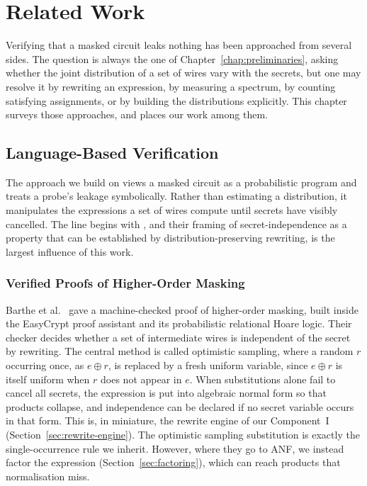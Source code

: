 \setlength{\parindent}{0pt}
\chapter{Related Work}
\label{chap:related}
Verifying that a masked circuit leaks nothing has been approached from several
sides.
The question is always the one of Chapter~\ref{chap:preliminaries}, asking whether the joint
distribution of a set of wires vary with the secrets, but one may resolve it by
rewriting an expression, by measuring a spectrum, by counting satisfying
assignments, or by building the distributions explicitly. This chapter surveys those
approaches, and places our work among them.

\section{Language-Based Verification} %
\label{sec:language-based}

The approach we build on views a masked circuit as a probabilistic program and
treats a probe's leakage symbolically. Rather than estimating a distribution, it
manipulates the expressions a set of wires compute until secrets have
visibly cancelled. The line begins with \parencite{barthe2015verified},
and their framing of secret-independence as a property that can be established by
distribution-preserving rewriting, is the largest influence of this work.

  \subsection{Verified Proofs of Higher-Order Masking}
  \label{sec:related-barthe}

  Barthe et al.\ \parencite{barthe2015verified} gave a machine-checked
  proof of higher-order masking, built inside the EasyCrypt proof assistant and
  its probabilistic relational Hoare logic. Their checker decides whether a set of %
  intermediate wires is independent of the secret by rewriting. The central
  method is called optimistic sampling, where a random $r$ occurring once, as
  $e \oplus r$, is replaced by a fresh uniform variable, since $e \oplus r$ is
  itself uniform when $r$ does not appear in $e$. When substitutions alone
  fail to cancel all secrets, the expression is put into algebraic normal form so that
  products collapse, and independence can be declared if no secret variable occurs in that form.
  This is, in miniature, the rewrite engine of our Component~I
  (Section~\ref{sec:rewrite-engine}). The optimistic sampling substitution is
  exactly the single-occurrence rule we inherit. However, where they go to ANF,
  we instead factor the expression (Section~\ref{sec:factoring}), which can reach
  products that normalisation miss.

